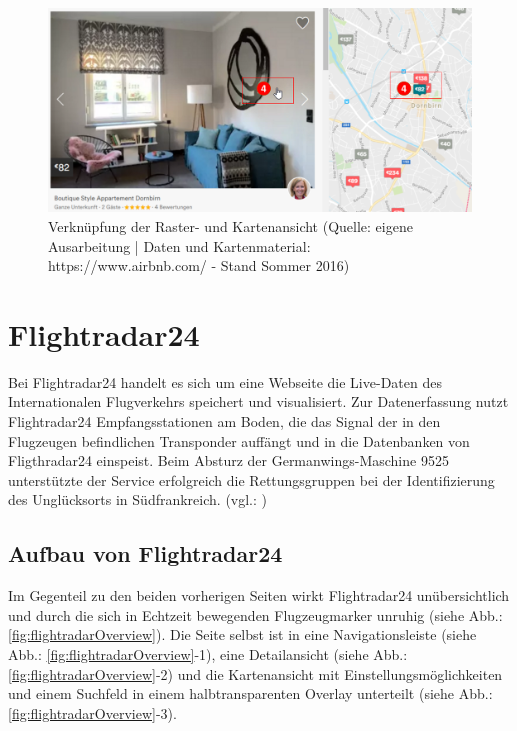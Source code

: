 \documentclass[../Bachelorarbeit.tex]{subfiles}
\begin{document}
\begin{figure}[H]
\centering
\includegraphics[width=1\linewidth]{img/StandDerTechnik/airbnbDetail}
\caption[Verknüpfung der Raster- und Kartenansicht]{Verknüpfung der Raster- und Kartenansicht (Quelle: eigene Ausarbeitung | Daten und Kartenmaterial: https://www.airbnb.com/ - Stand Sommer 2016)}
\label{fig:airbnbDetail}
\end{figure}




\section{Flightradar24}
\label{Flightradar}
Bei Flightradar24 handelt es sich um eine Webseite die Live-Daten des Internationalen Flugverkehrs speichert und visualisiert. 
Zur Datenerfassung nutzt Flightradar24 Empfangsstationen am Boden, die das Signal der in den Flugzeugen befindlichen Transponder auffängt und in die Datenbanken von Fligthradar24 einspeist. 
Beim Absturz der Germanwings-Maschine 9525 unterstützte der Service erfolgreich die Rettungsgruppen bei der Identifizierung des Unglücksorts in Südfrankreich. (vgl.: \cite{SiebeckFlightradar})


\subsection{Aufbau von Flightradar24}
\label{flightradarAufbau}
Im Gegenteil zu den beiden vorherigen Seiten wirkt Flightradar24 unübersichtlich und durch die sich in Echtzeit bewegenden Flugzeugmarker unruhig (siehe Abb.: \ref{fig:flightradarOverview}).
Die Seite selbst ist in eine Navigationsleiste (siehe Abb.: \ref{fig:flightradarOverview}-1), eine Detailansicht (siehe Abb.: \ref{fig:flightradarOverview}-2) und die Kartenansicht mit Einstellungsmöglichkeiten und einem Suchfeld in einem halbtransparenten Overlay unterteilt (siehe Abb.: \ref{fig:flightradarOverview}-3). 
\end{document}

